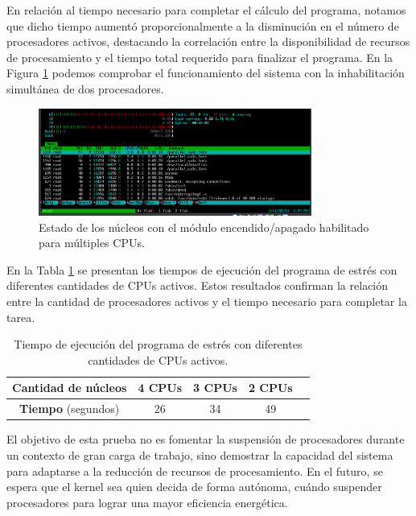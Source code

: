 En relación al tiempo necesario para completar el cálculo del programa, notamos que dicho tiempo aumentó proporcionalmente a la disminución en el número de procesadores activos, destacando la correlación entre la disponibilidad de recursos de procesamiento y el tiempo total requerido para finalizar el programa. En la Figura \ref{fig:cpuOnOff-result-2cpu} podemos comprobar el funcionamiento del sistema con la inhabilitación simultánea de dos procesadores.\par

\begin{figure}[H]
    \centering
    \includegraphics[width=0.8\textwidth]{images/cpuOnOff-result-2CPU.png}
    \caption{Estado de los núcleos con el módulo encendido/apagado habilitado para múltiples CPUs.}
    \label{fig:cpuOnOff-result-2cpu}
\end{figure}

En la Tabla \ref{tabla:cpuOnOff-result-times} se presentan los tiempos de ejecución del programa de estrés con diferentes cantidades de CPUs activos. Estos resultados confirman la relación entre la cantidad de procesadores activos y el tiempo necesario para completar la tarea.\par

\begin{table}[H]
    \centering
    \begin{tabular}{|c|c|c|c|c|}
        \hline
        \textbf{Cantidad de núcleos} & \textbf{4 CPUs} & \textbf{3 CPUs} & \textbf{2 CPUs} \\
        \hline
        \textbf{Tiempo} (segundos)   & 26              & 34              & 49              \\
        \hline
    \end{tabular}
    \caption{Tiempo de ejecución del programa de estrés con diferentes cantidades de CPUs activos.}
    \label{tabla:cpuOnOff-result-times}
\end{table}

El objetivo de esta prueba no es fomentar la suspensión de procesadores durante un contexto de gran carga de trabajo, sino demostrar la capacidad del sistema para adaptarse a la reducción de recursos de procesamiento. En el futuro, se espera que el kernel sea quien decida de forma autónoma, cuándo suspender procesadores para lograr una mayor eficiencia energética.\par

